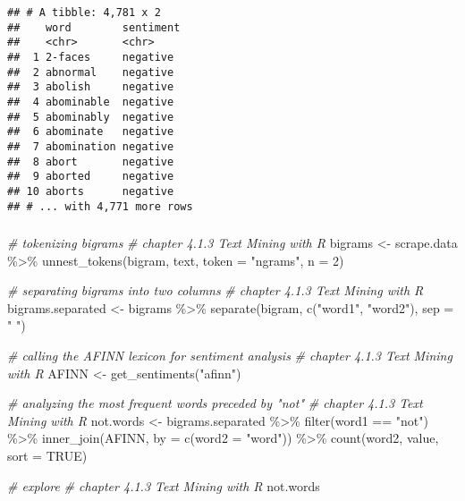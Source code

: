 \documentclass[
]{article}
\newenvironment{Shaded}{\begin{snugshade}}{\end{snugshade}}
\newcommand{\AttributeTok}[1]{\textcolor[rgb]{0.77,0.63,0.00}{#1}}
\newcommand{\CommentTok}[1]{\textcolor[rgb]{0.56,0.35,0.01}{\textit{#1}}}
\newcommand{\ConstantTok}[1]{\textcolor[rgb]{0.00,0.00,0.00}{#1}}
\newcommand{\DecValTok}[1]{\textcolor[rgb]{0.00,0.00,0.81}{#1}}
\newcommand{\FunctionTok}[1]{\textcolor[rgb]{0.00,0.00,0.00}{#1}}
\newcommand{\NormalTok}[1]{#1}
\newcommand{\OtherTok}[1]{\textcolor[rgb]{0.56,0.35,0.01}{#1}}
\newcommand{\SpecialCharTok}[1]{\textcolor[rgb]{0.00,0.00,0.00}{#1}}
\newcommand{\StringTok}[1]{\textcolor[rgb]{0.31,0.60,0.02}{#1}}
\begin{document}
\begin{verbatim}
## # A tibble: 4,781 x 2
##    word        sentiment
##    <chr>       <chr>    
##  1 2-faces     negative 
##  2 abnormal    negative 
##  3 abolish     negative 
##  4 abominable  negative 
##  5 abominably  negative 
##  6 abominate   negative 
##  7 abomination negative 
##  8 abort       negative 
##  9 aborted     negative 
## 10 aborts      negative 
## # ... with 4,771 more rows
\end{verbatim}

\hypertarget{section}{%
\subsubsection{}\label{section}}

\begin{Shaded}
\begin{Highlighting}[]
\CommentTok{\# tokenizing bigrams}
\CommentTok{\# chapter 4.1.3 Text Mining with R}
\NormalTok{bigrams }\OtherTok{\textless{}{-}}\NormalTok{ scrape.data }\SpecialCharTok{\%\textgreater{}\%}
  \FunctionTok{unnest\_tokens}\NormalTok{(bigram, text, }\AttributeTok{token =} \StringTok{"ngrams"}\NormalTok{, }\AttributeTok{n =} \DecValTok{2}\NormalTok{)}

\CommentTok{\# separating bigrams into two columns}
\CommentTok{\# chapter 4.1.3 Text Mining with R}
\NormalTok{bigrams.separated }\OtherTok{\textless{}{-}}\NormalTok{ bigrams }\SpecialCharTok{\%\textgreater{}\%}
  \FunctionTok{separate}\NormalTok{(bigram, }\FunctionTok{c}\NormalTok{(}\StringTok{"word1"}\NormalTok{, }\StringTok{"word2"}\NormalTok{), }\AttributeTok{sep =} \StringTok{" "}\NormalTok{)}

\CommentTok{\# calling the AFINN lexicon for sentiment analysis}
\CommentTok{\# chapter 4.1.3 Text Mining with R}
\NormalTok{AFINN }\OtherTok{\textless{}{-}} \FunctionTok{get\_sentiments}\NormalTok{(}\StringTok{"afinn"}\NormalTok{)}

\CommentTok{\# analyzing the most frequent words preceded by "not"}
\CommentTok{\# chapter 4.1.3 Text Mining with R}
\NormalTok{not.words }\OtherTok{\textless{}{-}}\NormalTok{ bigrams.separated }\SpecialCharTok{\%\textgreater{}\%}
  \FunctionTok{filter}\NormalTok{(word1 }\SpecialCharTok{==} \StringTok{"not"}\NormalTok{) }\SpecialCharTok{\%\textgreater{}\%}
  \FunctionTok{inner\_join}\NormalTok{(AFINN, }\AttributeTok{by =} \FunctionTok{c}\NormalTok{(}\AttributeTok{word2 =} \StringTok{"word"}\NormalTok{)) }\SpecialCharTok{\%\textgreater{}\%}
  \FunctionTok{count}\NormalTok{(word2, value, }\AttributeTok{sort =} \ConstantTok{TRUE}\NormalTok{)}

\CommentTok{\# explore}
\CommentTok{\# chapter 4.1.3 Text Mining with R}
\NormalTok{not.words}
\end{Highlighting}
\end{Shaded}
\end{document}
